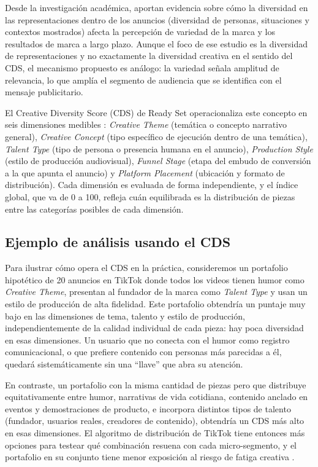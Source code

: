 \documentclass[12pt, a4paper]{report}
\begin{document}
Desde la investigación académica, \citet{jcr_diversity2024} aportan evidencia sobre cómo la diversidad
en las representaciones dentro de los anuncios (diversidad de personas, situaciones y contextos
mostrados) afecta la percepción de variedad de la marca y los resultados de marca a largo plazo.
Aunque el foco de ese estudio es la diversidad de representaciones y no exactamente la diversidad
creativa en el sentido del CDS, el mecanismo propuesto es análogo: la variedad señala amplitud de
relevancia, lo que amplía el segmento de audiencia que se identifica con el mensaje publicitario.

El Creative Diversity Score (CDS) de Ready Set operacionaliza este concepto en seis dimensiones
medibles \citep{readyset2025}: \textit{Creative Theme} (temática o concepto narrativo general),
\textit{Creative Concept} (tipo específico de ejecución dentro de una temática), \textit{Talent Type}
(tipo de persona o presencia humana en el anuncio), \textit{Production Style} (estilo de producción
audiovisual), \textit{Funnel Stage} (etapa del embudo de conversión a la que apunta el anuncio) y
\textit{Platform Placement} (ubicación y formato de distribución). Cada dimensión es evaluada de
forma independiente, y el índice global, que va de 0 a 100, refleja cuán equilibrada es la
distribución de piezas entre las categorías posibles de cada dimensión.

\subsection{Ejemplo de análisis usando el CDS}

Para ilustrar cómo opera el CDS en la práctica, consideremos un portafolio hipotético de 20 anuncios
en TikTok donde todos los videos tienen humor como \textit{Creative Theme}, presentan al fundador de
la marca como \textit{Talent Type} y usan un estilo de producción de alta fidelidad. Este portafolio
obtendría un puntaje muy bajo en las dimensiones de tema, talento y estilo de producción,
independientemente de la calidad individual de cada pieza: hay poca diversidad en esas dimensiones.
Un usuario que no conecta con el humor como registro comunicacional, o que prefiere contenido con
personas más parecidas a él, quedará sistemáticamente sin una ``llave'' que abra su atención.

En contraste, un portafolio con la misma cantidad de piezas pero que distribuye equitativamente entre
humor, narrativas de vida cotidiana, contenido anclado en eventos y demostraciones de producto, e
incorpora distintos tipos de talento (fundador, usuarios reales, creadores de contenido), obtendría
un CDS más alto en esas dimensiones. El algoritmo de distribución de TikTok tiene entonces más
opciones para testear qué combinación resuena con cada micro-segmento, y el portafolio en su conjunto
tiene menor exposición al riesgo de fatiga creativa \citep{readyset2025}.
\end{document}

